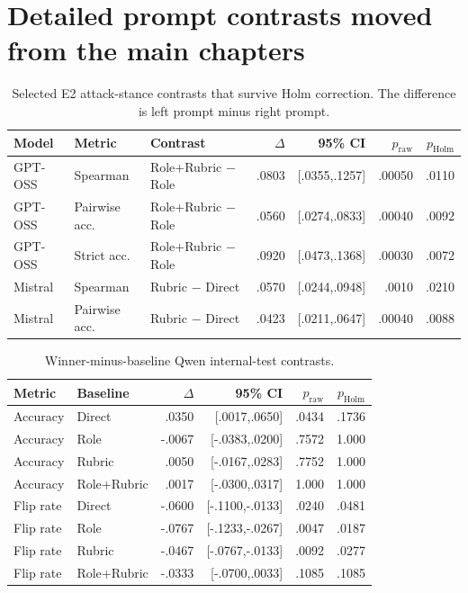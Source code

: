 \documentclass[11pt,twoside,a4paper]{report}
\newcommand{\rawp}{\ensuremath{p_{\mathrm{raw}}}}
\newcommand{\holmp}{\ensuremath{p_{\mathrm{Holm}}}}
\begin{document}
\section{Detailed prompt contrasts moved from the main chapters}

\begin{table}[htbp]
\centering
\caption{Selected E2 attack-stance contrasts that survive Holm correction.  The
difference is left prompt minus right prompt.}
\label{tab:e2-conditional}
\begin{tabularx}{\textwidth}{llYrrrr}
\toprule
Model & Metric & Contrast & $\Delta$ & 95\% CI & \rawp{} & \holmp{} \\
\midrule
GPT-OSS & Spearman & Role+Rubric $-$ Role & .0803 & [.0355,.1257] & .00050 & .0110 \\
GPT-OSS & Pairwise acc. & Role+Rubric $-$ Role & .0560 & [.0274,.0833] & .00040 & .0092 \\
GPT-OSS & Strict acc. & Role+Rubric $-$ Role & .0920 & [.0473,.1368] & .00030 & .0072 \\
Mistral & Spearman & Rubric $-$ Direct & .0570 & [.0244,.0948] & .0010 & .0210 \\
Mistral & Pairwise acc. & Rubric $-$ Direct & .0423 & [.0211,.0647] & .00040 & .0088 \\
\bottomrule
\end{tabularx}
\end{table}

\begin{table}[htbp]
\centering
\caption{Winner-minus-baseline Qwen internal-test contrasts.}
\label{tab:qwen-internal-contrasts}
\begin{tabularx}{\textwidth}{llrrrr}
\toprule
Metric & Baseline & $\Delta$ & 95\% CI & \rawp{} & \holmp{} \\
\midrule
Accuracy & Direct & .0350 & [.0017,.0650] & .0434 & .1736 \\
Accuracy & Role & -.0067 & [-.0383,.0200] & .7572 & 1.000 \\
Accuracy & Rubric & .0050 & [-.0167,.0283] & .7752 & 1.000 \\
Accuracy & Role+Rubric & .0017 & [-.0300,.0317] & 1.000 & 1.000 \\
\addlinespace
Flip rate & Direct & -.0600 & [-.1100,-.0133] & .0240 & .0481 \\
Flip rate & Role & -.0767 & [-.1233,-.0267] & .0047 & .0187 \\
Flip rate & Rubric & -.0467 & [-.0767,-.0133] & .0092 & .0277 \\
Flip rate & Role+Rubric & -.0333 & [-.0700,.0033] & .1085 & .1085 \\
\bottomrule
\end{tabularx}
\end{table}
\end{document}
